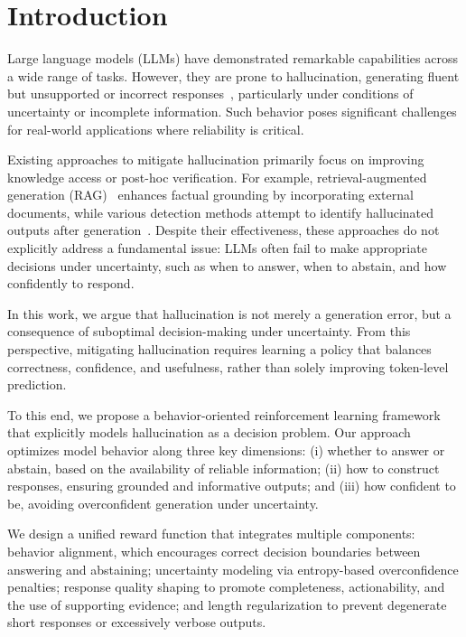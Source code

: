 \section{Introduction}

Large language models (LLMs) have demonstrated remarkable capabilities across a wide range of tasks. 
However, they are prone to hallucination, generating fluent but unsupported or incorrect responses~\cite{ji2023survey,Ji_2023,lin2022truthfulqameasuringmodelsmimic}, particularly under conditions of uncertainty or incomplete information. 
Such behavior poses significant challenges for real-world applications where reliability is critical.

Existing approaches to mitigate hallucination primarily focus on improving knowledge access or post-hoc verification. 
For example, retrieval-augmented generation (RAG)~\cite{rag} enhances factual grounding by incorporating external documents, while various detection methods attempt to identify hallucinated outputs after generation~\cite{lin2022truthfulqameasuringmodelsmimic}. 
Despite their effectiveness, these approaches do not explicitly address a fundamental issue: LLMs often fail to make appropriate decisions under uncertainty, such as when to answer, when to abstain, and how confidently to respond.

In this work, we argue that hallucination is not merely a generation error, but a consequence of suboptimal decision-making under uncertainty. 
From this perspective, mitigating hallucination requires learning a policy that balances correctness, confidence, and usefulness, rather than solely improving token-level prediction.

To this end, we propose a behavior-oriented reinforcement learning framework that explicitly models hallucination as a decision problem. 
Our approach optimizes model behavior along three key dimensions:
(i) whether to answer or abstain, based on the availability of reliable information; 
(ii) how to construct responses, ensuring grounded and informative outputs; and 
(iii) how confident to be, avoiding overconfident generation under uncertainty.

We design a unified reward function that integrates multiple components: 
behavior alignment, which encourages correct decision boundaries between answering and abstaining; 
uncertainty modeling via entropy-based overconfidence penalties; 
response quality shaping to promote completeness, actionability, and the use of supporting evidence; 
and length regularization to prevent degenerate short responses or excessively verbose outputs.

